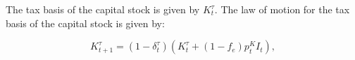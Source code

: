 The tax basis of the capital stock is given by $K^{\tau}_{t}$.  The law of motion for the tax basis of the capital stock is given by:

\begin{equation}
\label{eqn:lom_taxcapital}
K^{\tau}_{t+1}=(1-\delta^{\tau}_{t})(K^{\tau}_{t} + (1-f_{e})p^{K}_{t}I_{t}),
\end{equation}

%
%
%
%
